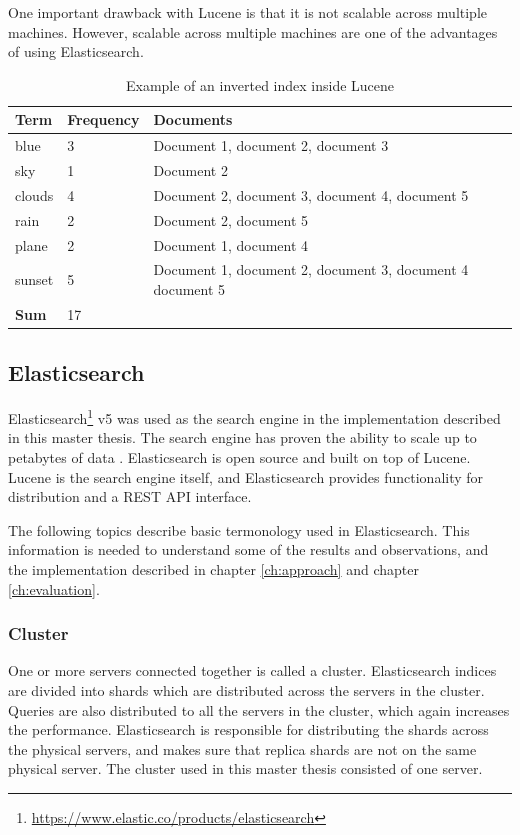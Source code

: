 One important drawback with Lucene is that it is not scalable across multiple machines.
However, scalable across multiple machines are one of the advantages of using Elasticsearch.

\begin{table}[h]
    \centering
    \begin{tabular}{l|l|l}
    Term   & Frequency & Documents                                                 \\ \hline
    blue   & 3         & Document 1, document 2, document 3                        \\
    sky    & 1         & Document 2                                                \\
    clouds & 4         & Document 2, document 3, document 4, document 5            \\
    rain   & 2         & Document 2, document 5                                    \\
    plane  & 2         & Document 1, document 4                                    \\
    sunset & 5         & Document 1, document 2, document 3, document 4 document 5 \\ \hline
    \textbf{Sum} & 17  &                                                           \\
    \end{tabular}
    \caption{Example of an inverted index inside Lucene}
    \label{tbl:inverted-index}
\end{table}


\subsection{Elasticsearch}
Elasticsearch\footnote{\url{https://www.elastic.co/products/elasticsearch}} v5 was used as the search engine in the implementation described in this master thesis.
The search engine has proven the ability to scale up to petabytes of data \cite{elasticsearch-scale}.
Elasticsearch is open source and built on top of Lucene.
Lucene is the search engine itself,
and Elasticsearch provides functionality for distribution and a REST API interface.

The following topics describe basic termonology used in Elasticsearch.
This information is needed to understand some of the results and observations,
and the implementation described in chapter \ref{ch:approach} and chapter \ref{ch:evaluation}.

\subsubsection{Cluster}
One or more servers connected together is called a cluster.
Elasticsearch indices are divided into shards which are distributed across the servers in the cluster.
Queries are also distributed to all the servers in the cluster, which again increases the performance.
Elasticsearch is responsible for distributing the shards across the physical servers,
and makes sure that replica shards are not on the same physical server.
The cluster used in this master thesis consisted of one server.

